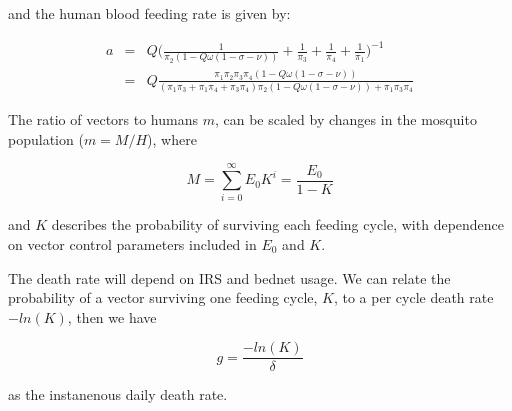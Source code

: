 \documentclass[a4paper,12pt]{article}
\begin{document}
and the human blood feeding rate is given by:

\begin{eqnarray}
a &=& Q\bigg(\frac{1}{\pi_2(1-Q\omega(1-\sigma-\nu))} + \frac{1}{\pi_3}+\frac{1}{\pi_4}+\frac{1}{\pi_1}\bigg)^{-1}\\
&=& Q\frac{\pi_1\pi_2\pi_3\pi_4(1-Q\omega(1-\sigma-\nu))}{(\pi_1\pi_3+\pi_1\pi_4+\pi_3\pi_4)\pi_2(1-Q\omega(1-\sigma-\nu))+\pi_1\pi_3\pi_4}
\end{eqnarray}

The ratio of vectors to humans $m$, can be scaled by changes in the mosquito population ($m=M/H$), where

\begin{equation}
M = \sum_{i=0}^{\infty}E_0K^i = \frac{E_0}{1-K}
\end{equation}

and $K$ describes the probability of surviving each feeding cycle, with dependence on vector control parameters included in $E_0$ and $K$.

The death rate will depend on IRS and bednet usage. We can relate the probability of a vector surviving one feeding cycle, $K$, to a per cycle death rate $-ln(K)$, then we have

\begin{equation}
g = \frac{-ln(K)}{\delta}
\end{equation}

as the instanenous daily death rate.

\FloatBarrier
\end{document}
